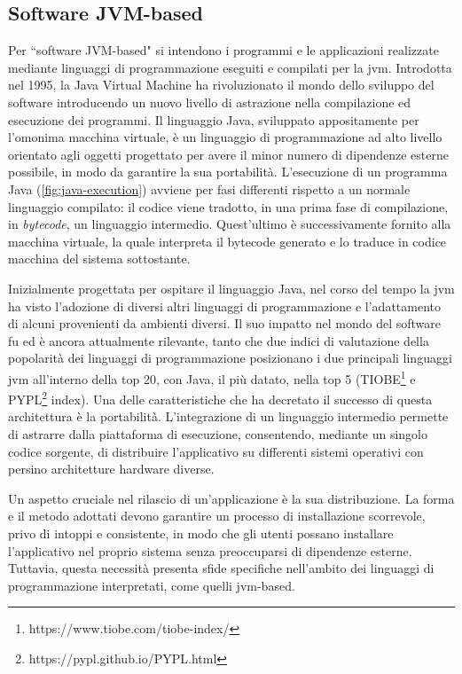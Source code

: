 \subsection{Software JVM-based}
Per ``software JVM-based" si intendono i programmi e le applicazioni realizzate mediante linguaggi di programmazione eseguiti e compilati per la \ac{jvm}. Introdotta nel 1995, la Java Virtual Machine ha rivoluzionato il mondo dello sviluppo del software introducendo un nuovo livello di astrazione nella compilazione ed esecuzione dei programmi. Il linguaggio Java, sviluppato appositamente per l'omonima macchina virtuale, è un linguaggio di programmazione ad alto livello orientato agli oggetti progettato per avere il minor numero di dipendenze esterne possibile, in modo da garantire la sua portabilità. L'esecuzione di un programma Java (\cref{fig:java-execution}) avviene per fasi differenti rispetto a un normale linguaggio compilato: il codice viene tradotto, in una prima fase di compilazione, in \textit{bytecode}, un linguaggio intermedio. Quest'ultimo è successivamente fornito alla macchina virtuale, la quale interpreta il bytecode generato e lo traduce in codice macchina del sistema sottostante.


Inizialmente progettata per ospitare il linguaggio Java, nel corso del tempo la \ac{jvm} ha visto l'adozione di diversi altri linguaggi di programmazione e l'adattamento di alcuni provenienti da ambienti diversi. Il suo impatto nel mondo del software fu ed è ancora attualmente rilevante, tanto che due indici di valutazione della popolarità dei linguaggi di programmazione posizionano i due principali linguaggi \ac{jvm} all'interno della top 20, con Java, il più datato, nella top 5 (TIOBE\footnote{https://www.tiobe.com/tiobe-index/} e PYPL\footnote{https://pypl.github.io/PYPL.html} index). Una delle caratteristiche che ha decretato il successo di questa architettura è la portabilità. L'integrazione di un linguaggio intermedio permette di astrarre dalla piattaforma di esecuzione, consentendo, mediante un singolo codice sorgente, di distribuire l'applicativo su differenti sistemi operativi con persino architetture hardware diverse.

Un aspetto cruciale nel rilascio di un'applicazione è la sua distribuzione. La forma e il metodo adottati devono garantire un processo di installazione scorrevole, privo di intoppi e consistente, in modo che gli utenti possano installare l'applicativo nel proprio sistema senza preoccuparsi di dipendenze esterne. Tuttavia, questa necessità presenta sfide specifiche nell'ambito dei linguaggi di programmazione interpretati, come quelli \ac{jvm}-based.

